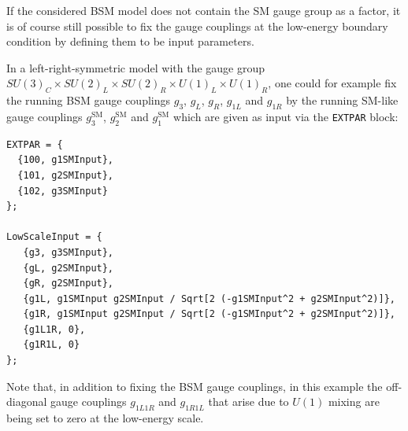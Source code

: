 \documentclass[final,3p,11pt,pdflatex]{elsarticle}
\newcommand{\code}[1]{\lstinline|#1|}  %
\newcommand{\SM}{\ensuremath{\text{SM}}\xspace}
\begin{document}
%
If the considered BSM model does not contain the SM gauge
group as a factor, it is of course still possible to fix the gauge
couplings at the low-energy boundary condition by defining them to be
input parameters.
%
\begin{example}
  In a left-right-symmetric model with the gauge group $SU(3)_C\times
  SU(2)_L\times SU(2)_R\times U(1)_L\times U(1)_R$, one could for
  example fix the running BSM gauge couplings $g_3$, $g_L$, $g_R$, $g_{1L}$
  and $g_{1R}$ by the running SM-like gauge couplings $g_3^\SM$,
  $g_2^\SM$ and $g_1^\SM$ which are given as input via the
  \code{EXTPAR} block:
%
\begin{lstlisting}
EXTPAR = {
  {100, g1SMInput},
  {101, g2SMInput},
  {102, g3SMInput}
};

LowScaleInput = {
   {g3, g3SMInput},
   {gL, g2SMInput},
   {gR, g2SMInput},
   {g1L, g1SMInput g2SMInput / Sqrt[2 (-g1SMInput^2 + g2SMInput^2)]},
   {g1R, g1SMInput g2SMInput / Sqrt[2 (-g1SMInput^2 + g2SMInput^2)]},
   {g1L1R, 0},
   {g1R1L, 0}
};
\end{lstlisting}
Note that, in addition to fixing the BSM gauge couplings, in this example
the off-diagonal gauge couplings $g_{1L1R}$ and $g_{1R1L}$ that arise due to
$U(1)$ mixing are being set to zero at the low-energy scale.
\end{example}
\end{document}
